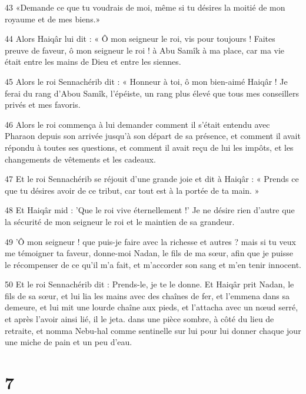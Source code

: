 \par 43 «Demande ce que tu voudrais de moi, même si tu désires la moitié de mon royaume et de mes biens.»

\par 44 Alors Haiqâr lui dit : « Ô mon seigneur le roi, vis pour toujours ! Faites preuve de faveur, ô mon seigneur le roi ! à Abu Samîk à ma place, car ma vie était entre les mains de Dieu et entre les siennes.

\par 45 Alors le roi Sennachérib dit : « Honneur à toi, ô mon bien-aimé Haiqâr ! Je ferai du rang d'Abou Samîk, l'épéiste, un rang plus élevé que tous mes conseillers privés et mes favoris.

\par 46 Alors le roi commença à lui demander comment il s'était entendu avec Pharaon depuis son arrivée jusqu'à son départ de sa présence, et comment il avait répondu à toutes ses questions, et comment il avait reçu de lui les impôts, et les changements de vêtements et les cadeaux.

\par 47 Et le roi Sennachérib se réjouit d'une grande joie et dit à Haiqâr : « Prends ce que tu désires avoir de ce tribut, car tout est à la portée de ta main. »

\par 48 Et Haiqâr mid : 'Que le roi vive éternellement !' Je ne désire rien d'autre que la sécurité de mon seigneur le roi et le maintien de sa grandeur.

\par 49 'Ô mon seigneur ! que puis-je faire avec la richesse et autres ? mais si tu veux me témoigner ta faveur, donne-moi Nadan, le fils de ma sœur, afin que je puisse le récompenser de ce qu'il m'a fait, et m'accorder son sang et m'en tenir innocent.

\par 50 Et le roi Sennachérib dit : Prends-le, je te le donne. Et Haiqâr prit Nadan, le fils de sa sœur, et lui lia les mains avec des chaînes de fer, et l'emmena dans sa demeure, et lui mit une lourde chaîne aux pieds, et l'attacha avec un nœud serré, et après l'avoir ainsi lié, il le jeta. dans une pièce sombre, à côté du lieu de retraite, et nomma Nebu-hal comme sentinelle sur lui pour lui donner chaque jour une miche de pain et un peu d'eau.

\chapter{7}

